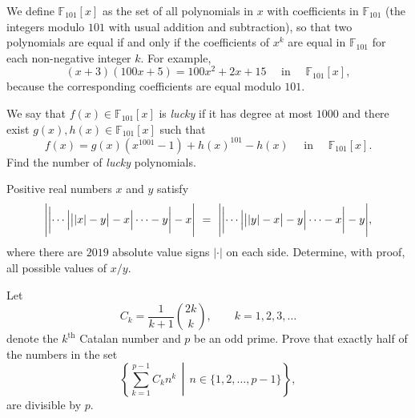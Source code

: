 \begin{question}[name={2020 HMMT, Algebra \& Number Theory, \href{https://artofproblemsolving.com/community/c4p14065090}{Problem 10}}]
	We define $\mathbb F_{101}[x]$ as the set of all polynomials in $x$ with coefficients in $\mathbb F_{101}$ (the integers modulo $101$ with usual addition and subtraction), so that two polynomials are equal if and only if the coefficients of $x^k$ are equal in $\mathbb F_{101}$ for each non-negative integer $k$. For example, $$(x+3)(100x+5)=100x^2+2x+15 \quad \text{ in } \quad \mathbb F_{101}[x],$$ because the corresponding coefficients are equal modulo $101$.
	
	We say that $f(x)\in\mathbb F_{101}[x]$ is \textit{lucky} if it has degree at most $1000$ and there exist $g(x),h(x)\in\mathbb F_{101}[x]$ such that\[f(x)=g(x)(x^{1001}-1)+h(x)^{101}-h(x) \quad \text{ in } \quad \mathbb F_{101}[x].\] Find the number of \textit{lucky} polynomials.
\end{question}



\begin{question}[name={2020 HMMT, Team, \href{https://artofproblemsolving.com/community/c4p14065378}{Problem 7}}]
	Positive real numbers $x$ and $y$ satisfy
	$$\Biggl|\biggl|\cdots\Bigl|\bigl||x|-y\bigr|-x\Bigr|\cdots -y\biggr|-x\Biggr|\ =\ \Biggl|\biggl|\cdots\Bigl|\bigl||y|-x\bigr|-y\Bigr|\cdots -x\biggr|-y\Biggr|,$$where there are $2019$ absolute value signs $|\cdot|$ on each side. Determine, with proof, all possible values of ${x}/{y}$.
\end{question}



%	




\begin{question}[name={2020 HMIC, \href{https://artofproblemsolving.com/community/c6h2052366p14590872}{Problem 4}}]
	Let $$C_k=\frac{1}{k+1}\binom{2k}{k}, \qquad k=1,2,3,\dots$$ denote the $k^{\text{th}}$ Catalan number and $p$ be an odd prime. Prove that exactly half of the numbers in the set
	\[\left\{\sum_{k=1}^{p-1}C_kn^k\,\middle\vert\, n\in\{1,2,\ldots,p-1\}\right\},\]are divisible by $p$.
\end{question}



%	


